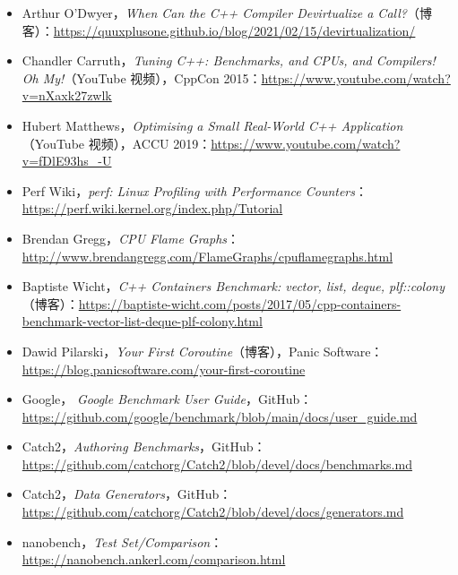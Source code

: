 \begin{itemize}
\item Arthur O'Dwyer，\emph{When Can the C++ Compiler Devirtualize a Call?}（博客）：\href{https://quuxplusone.github.io/blog/2021/02/15/devirtualization/}{https://quuxplusone.github.io/blog/2021/02/15/devirtualization/}
\item Chandler Carruth，\emph{Tuning C++: Benchmarks, and CPUs, and Compilers! Oh My!}（YouTube 视频），CppCon 2015：\href{https://www.youtube.com/watch?v=nXaxk27zwlk}{https://www.youtube.com/watch?v=nXaxk27zwlk}
\item Hubert Matthews，\emph{Optimising a Small Real-World C++ Application}（YouTube 视频），ACCU 2019：\href{https://www.youtube.com/watch?v=fDlE93hs_-U}{https://www.youtube.com/watch?v=fDlE93hs\_-U}
\item Perf Wiki，\emph{perf: Linux Profiling with Performance Counters}：\href{https://perf.wiki.kernel.org/index.php/Tutorial}{https://perf.wiki.kernel.org/index.php/Tutorial}
\item Brendan Gregg，\emph{CPU Flame Graphs}：\href{http://www.brendangregg.com/FlameGraphs/cpuflamegraphs.html}{http://www.brendangregg.com/FlameGraphs/cpuflamegraphs.html}
\item Baptiste Wicht，\emph{C++ Containers Benchmark: vector, list, deque, plf::colony}（博客）：\href{https://baptiste-wicht.com/posts/2017/05/cpp-containers-benchmark-vector-list-deque-plf-colony.html}{https://baptiste-wicht.com/posts/2017/05/cpp-containers-benchmark-vector-list-deque-plf-colony.html}
\item Dawid Pilarski，\emph{Your First Coroutine}（博客），Panic Software：\href{https://blog.panicsoftware.com/your-first-coroutine}{https://blog.panicsoftware.com/your-first-coroutine}
\item Google，\emph{ Google Benchmark User Guide}，GitHub：\href{https://github.com/google/benchmark/blob/main/docs/user_guide.md}{https://github.com/google/benchmark/blob/main/docs/user\_guide.md}
\item Catch2，\emph{Authoring Benchmarks}，GitHub：\href{https://github.com/catchorg/Catch2/blob/devel/docs/benchmarks.md}{https://github.com/catchorg/Catch2/blob/devel/docs/benchmarks.md}
\item Catch2，\emph{Data Generators}，GitHub：\href{https://github.com/catchorg/Catch2/blob/devel/docs/generators.md}{https://github.com/catchorg/Catch2/blob/devel/docs/generators.md}
\item nanobench，\emph{Test Set/Comparison}：\href{https://nanobench.ankerl.com/comparison.html}{https://nanobench.ankerl.com/comparison.html}

\end{itemize}
